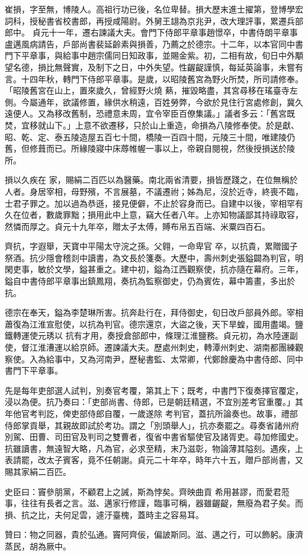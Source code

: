 \begin{pinyinscope}
 崔損，字至無，博陵人。高祖行功已後，名位卑替。損大歷末進士擢第，登博學宏詞科，授秘書省校書郎，再授咸陽尉。外舅王翃為京兆尹，改大理評事，累遷兵部郎中。
 貞元十一年，遷右諫議大夫。會門下侍郎平章事趙憬卒，中書侍朗平章事盧邁風病請告，戶部尚書裴延齡素與損善，乃薦之於德宗。十二年，以本官同中書門下平章事，與給事中趙宗儒同日知政事，並賜金紫。初，二相有故，旬日中外顒望名德，損比無聲實，及制下之日，中外失望。性齷齪謹慎，每延英論事，未嘗有言。十四年秋，轉門下侍郎平章事。是歲，以昭陵舊宮為野火所焚，所司請修奉。「昭陵舊宮在山上，置來歲久，曾經野火燒
 爇，摧毀略盡，其宮尋移在瑤臺寺左側。今屬通年，欲議修置，緣供水稍遠，百姓勞弊，今欲於見住行宮處修創，冀久遠便人。又為移改舊制，恐禮意未周，宜令宰臣百僚集議。」議者多云：「舊宮既焚，宜移就山下。」上意不欲遷移，只於山上重造，命損為八陵修奉使。於是獻、昭、乾、定、泰五陵造屋五百七十間，橋陵一百四十間，元陵三十間，唯建陵仍舊，但修葺而已。所緣陵寢中床蓐帷幄一事以上，帝親自閱視，然後授損送於陵所。



 損以久疾在
 家，賜絹二百匹以為醫藥。南北兩省清要，損皆歷踐之，在位無稱於人者。身居宰相，母野殯，不言展墓，不議遷祔；姊為尼，沒於近寺，終喪不臨，士君子罪之。加以過為恭遜，接見便僻，不止於容身而已。自建中以後，宰相罕有久在位者，數歲罪黜；損用此中上意，竊大任者八年。上亦知物議鄙其持祿取容，然憐而厚之。貞元十九年卒，贈太子太傅，賻布帛五百端、米粟四百石。



 齊抗，字遐舉，天寶中平陽太守浣之孫。父翱，一命卑官
 卒，以抗貴，累贈國子祭酒。抗少隱會稽剡中讀書，為文長於箋奏。大歷中，壽州刺史張鎰闢為判官，明閑吏事，敏於文學，鎰甚重之。建中初，鎰為江西觀察使，抗亦隨在幕府。三年，鎰自中書侍郎平章事出鎮鳳翔，奏抗為監察御史，仍為賓佐，幕中籌畫，多出於抗。



 德宗在奉天，鎰為李楚琳所害。抗奔赴行在，拜侍御史，旬日改戶部員外郎。宰相蕭復為江淮宣慰使，以抗為判官。德宗還京，大盜之後，天下旱蝗，國用盡竭。鹽鐵轉運使元琇以
 抗有才用，奏授倉部郎中，條理江淮鹽務。貞元初，為水陸運副使，督江淮漕運以給京師。遷諫議大夫。歷處州刺史，轉潭州刺史、湖南都團練觀察使。入為給事中，又為河南尹，歷秘書監、太常卿，代鄭餘慶為中書侍郎、同中書門下平章事。



 先是每年吏部選人試判，別奏官考覆，第其上下；既考，中書門下復奏擇官覆定，浸以為便。抗乃奏曰：「吏部尚書、侍郎，已是朝廷精選，不宜別差考官重覆。」其年他官考判訖，俾吏部侍郎自覆，一歲遂除
 考判官，蓋抗所論奏也。故事，禮部侍郎掌貢舉，其親故即試於考功。謂之「別頭舉人」，抗亦奏罷之。尋奏省諸州府別駕、田曹、司田官及判司之雙曹者，復省中書省驅使官及諸胥吏。尋加修國史。抗雖讀書，無遠智大略，凡為官，必求至精，末乃滋彰，物論薄其隘刻。遇疾，上表請罷，改太子賓客，竟不任朝謝。貞元二十年卒，時年六十五，贈戶部尚書，又賜其家絹二百匹。



 史臣曰：竇參朋黨，不顧君上之誡，斯為悖矣。齊映曲貢
 希用甚謬，而愛君蒞事，往往有長者之言。滋、邁家行修謹，臨事可稱，器雖齷齪，無廢為君子矣。而損、抗之比，夫何足雲，遽汙臺槐，蓋時主之容易耳。



 贊曰：物之同器，貴於弘通。竇阿齊佞，偏詖斯同。滋、邁之行，可以飾躬。康濟蒸民，胡為厥中。



\end{pinyinscope}